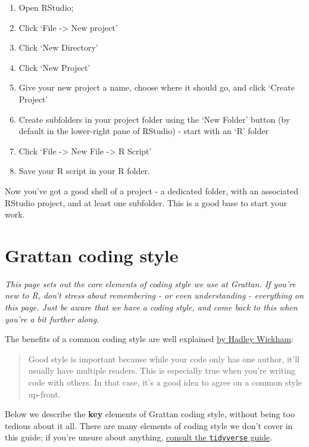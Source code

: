 \documentclass[]{book}
\providecommand{\tightlist}{%
  \setlength{\itemsep}{0pt}\setlength{\parskip}{0pt}}
\begin{document}
\begin{enumerate}
\def\labelenumi{\arabic{enumi}.}
\tightlist
\item
  Open RStudio;
\item
  Click `File -\textgreater{} New project'
\item
  Click `New Directory'
\item
  Click `New Project'
\item
  Give your new project a name, choose where it should go, and click `Create Project'
\item
  Create subfolders in your project folder using the `New Folder' button (by default in the lower-right pane of RStudio) - start with an `R' folder
\item
  Click `File -\textgreater{} New File -\textgreater{} R Script'
\item
  Save your R script in your R folder.
\end{enumerate}

Now you've got a good shell of a project - a dedicated folder, with an associated RStudio project, and at least one subfolder. This is a good base to start your work.

\hypertarget{coding-style}{%
\chapter{Grattan coding style}\label{coding-style}}

\emph{This page sets out the core elements of coding style we use at Grattan. If you're new to R, don't stress about remembering - or even understanding - everything on this page. Just be aware that we have a coding style, and come back to this when you're a bit further along.}

The benefits of a common coding style are well explained \href{http://r-pkgs.had.co.nz/style.html}{by Hadley Wickham}:

\begin{quote}
Good style is important because while your code only has one author, it'll usually have multiple readers. This is especially true when you're writing code with others. In that case, it's a good idea to agree on a common style up-front.
\end{quote}

Below we describe the \textbf{key} elements of Grattan coding style, without being too tedious about it all. There are many elements of coding style we don't cover in this guide; if you're unsure about anything, \href{https://style.tidyverse.org/}{consult the \texttt{tidyverse} guide}.
\end{document}
